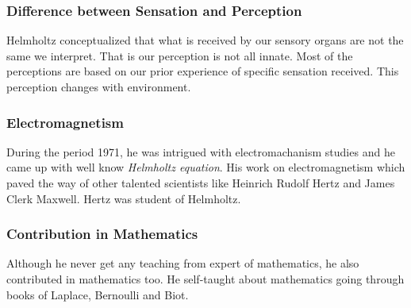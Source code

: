 \documentclass[11pt]{article}
\begin{document}
\subsubsection{Difference between Sensation and Perception}
Helmholtz conceptualized that what is received by our sensory organs are not the same we interpret. That is our perception is not all innate. Most of the perceptions are based on our prior experience of specific sensation received. This perception changes with environment.

\subsubsection{Electromagnetism}
During the period 1971, he was intrigued with electromachanism studies and he came up with well know \textit{Helmholtz equation}. His work on electromagnetism which paved the way of other talented scientists like Heinrich Rudolf Hertz and James Clerk Maxwell. Hertz was student of Helmholtz.

\subsubsection{Contribution in Mathematics}
Although he never get any teaching from expert of mathematics, he also contributed in mathematics too. He self-taught about mathematics going through books of Laplace, Bernoulli and Biot.
\end{document}
